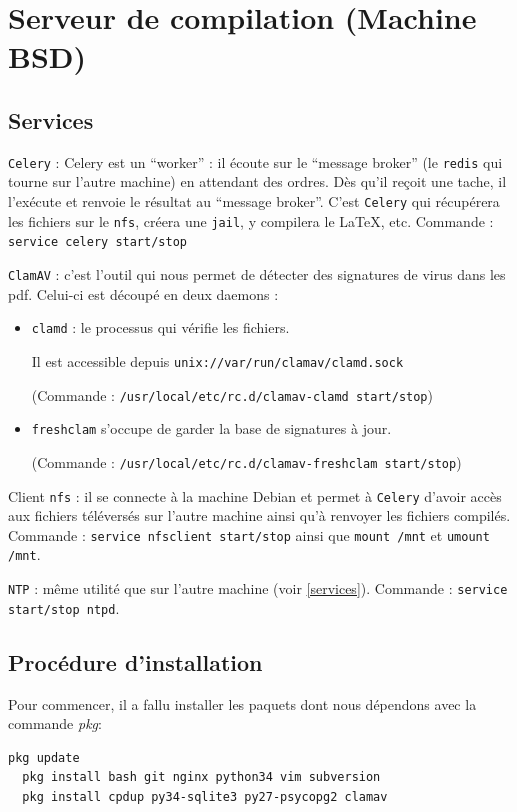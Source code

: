 \documentclass[10pt,a4paper]{article}
\begin{document}
\section{Serveur de compilation (Machine BSD)}
\subsection{Services}

\texttt{Celery} : Celery est un ``worker'' : il écoute sur le ``message broker'' (le \texttt{redis} qui tourne sur l'autre machine) en attendant des ordres.
Dès qu'il reçoit une tache, il l'exécute et renvoie le résultat au ``message broker''.
C'est \texttt{Celery} qui récupérera les fichiers sur le \texttt{nfs}, créera une \texttt{jail}, y compilera le \LaTeX, etc.
Commande : \texttt{service celery start/stop}

\texttt{ClamAV} : c'est l'outil qui nous permet de détecter des signatures de virus dans les pdf.
Celui-ci est découpé en deux daemons :
        \begin{itemize}
            \item \texttt{clamd} : le processus qui vérifie les fichiers.

            Il est accessible depuis \texttt{unix://var/run/clamav/clamd.sock}

            (Commande : \texttt{/usr/local/etc/rc.d/clamav-clamd start/stop})
            \item \texttt{freshclam} s'occupe de garder la base de signatures à jour.

            (Commande : \texttt{/usr/local/etc/rc.d/clamav-freshclam start/stop})
        \end{itemize}

\vspace{1em} %
Client \texttt{nfs} : il se connecte à la machine Debian et permet à \texttt{Celery} d'avoir accès aux fichiers téléversés sur l'autre machine ainsi qu'à renvoyer les fichiers compilés.
Commande : \texttt{service nfsclient start/stop} ainsi que \texttt{mount /mnt} et \texttt{umount /mnt}.

\texttt{NTP} : même utilité que sur l'autre machine (voir \ref{services}).
Commande : \texttt{service start/stop ntpd}.

\subsection{Procédure d'installation}
Pour commencer, il a fallu installer les paquets dont nous dépendons avec la commande \emph{pkg}:
\begin{lstlisting}[language=bash]
  pkg update
  pkg install bash git nginx python34 vim subversion
  pkg install cpdup py34-sqlite3 py27-psycopg2 clamav
\end{lstlisting}
\end{document}
